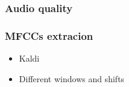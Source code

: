 \subsubsection{Audio quality}
\subsubsection{MFCCs extracion}
	\begin{itemize}
		\item Kaldi
		\item Different windows and shifts 
	\end{itemize}